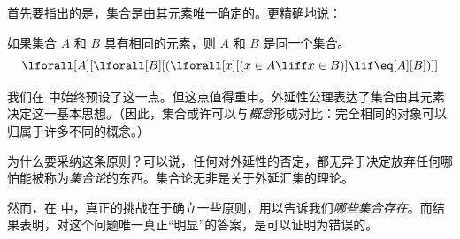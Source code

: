 \documentclass[../../../include/open-logic-section]{subfiles}
\begin{document}

首先要指出的是，集合是由其元素唯一确定的。更精确地说：

\begin{axiom}[外延性公理]
如果集合 $A$ 和 $B$ 具有相同的元素，则 $A$ 和 $B$ 是同一个集合。
\[
  \lforall[A][\lforall[B][(\lforall[x][(x \in A \liff x \in B)] \lif
  \eq[A][B])]]
\]
\end{axiom}

我们在  中始终预设了这一点。但这点值得重申。外延性公理表达了集合由其元素决定这一基本思想。（因此，集合或许可以与\emph{概念}形成对比：完全相同的对象可以归属于许多不同的概念。）

为什么要采纳这条原则？可以说，任何对外延性的否定，都无异于决定放弃任何哪怕能被称为\emph{集合论}的东西。集合论无非是关于外延汇集的理论。

然而，在  中，真正的挑战在于确立一些原则，用以告诉我们\emph{哪些集合存在}。而结果表明，对这个问题唯一真正“明显”的答案，是可以证明为错误的。
\end{document}
